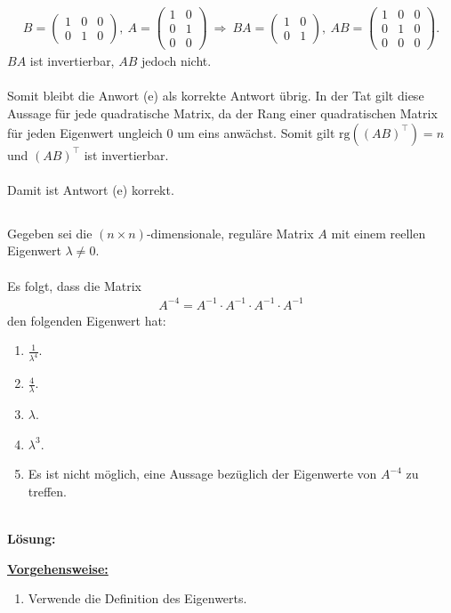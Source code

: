 \begin{align*}
	B
	=
	\begin{pmatrix}
		1 & 0 & 0 \\
		0 & 1 & 0
	\end{pmatrix},
	\
	A 
	=
	\begin{pmatrix}
		1 & 0 \\
		0 & 1\\
		0 & 0
	\end{pmatrix}
	\ \Rightarrow \
	BA=
	\begin{pmatrix}
		1 & 0\\
		0 & 1
	\end{pmatrix}, \
	AB =
	\begin{pmatrix}
		1 & 0 & 0\\
		0 & 1 & 0\\
		0 & 0 & 0
	\end{pmatrix}.
\end{align*}
$BA$ ist invertierbar, $AB$ jedoch nicht.\\
\\
Somit bleibt die Anwort (e) als korrekte Antwort übrig.
In der Tat gilt diese Aussage für jede quadratische Matrix,
da der Rang einer quadratischen Matrix für jeden Eigenwert ungleich $0$ um eins anwächst. Somit gilt $\mathrm{rg}\left((AB)^\top\right) = n$ und $(AB)^\top $ ist invertierbar.\\
\\
Damit ist Antwort (e) korrekt.
\newpage

\subsection*{}
Gegeben sei die $ (n \times n ) $-dimensionale, reguläre Matrix $ A $ mit einem reellen Eigenwert $ \lambda \neq 0 $.\\
\\
Es folgt, dass die Matrix
\begin{align*}
	A^{-4} = A^{-1} \cdot A^{-1} \cdot A^{-1} \cdot A^{-1}
\end{align*}
den folgenden Eigenwert hat:
\renewcommand{\labelenumi}{(\alph{enumi})}
\begin{enumerate}
	\item 
	$ \frac{1}{\lambda^4} $.
	\item 
	$ \frac{4}{\lambda} $.
	\item
	$ \lambda$.
	\item
	$\lambda^3 $.
	\item 
	Es ist nicht möglich, eine Aussage bezüglich der Eigenwerte von $ A^{-4} $ zu treffen.
\end{enumerate}
\ \\
\textbf{Lösung:}
\begin{mdframed}
\underline{\textbf{Vorgehensweise:}}
\renewcommand{\labelenumi}{\theenumi.}
\begin{enumerate}
\item Verwende die Definition des Eigenwerts.
\end{enumerate}
\end{mdframed}

